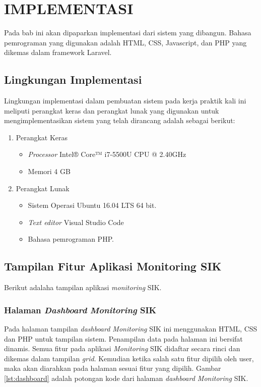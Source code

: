 \chapter{IMPLEMENTASI}
Pada bab ini akan dipaparkan implementasi dari sistem yang dibangun. Bahasa pemrograman yang digunakan adalah HTML, CSS, Javascript, dan PHP yang dikemas dalam framework Laravel.

\section{Lingkungan Implementasi}
\tab Lingkungan implementasi dalam pembuatan sistem pada kerja praktik kali ini meliputi perangkat keras dan perangkat lunak yang digunakan untuk mengimplementasikan sistem yang telah dirancang adalah sebagai berikut:
\begin{enumerate}
	\item Perangkat Keras
	\begin{itemize}
	\item \textit{Processor} Intel® Core™ i7-5500U CPU @ 2.40GHz
	\item Memori 4 GB
	\end{itemize}
	\item Perangkat Lunak
	\begin{itemize}
	\item Sistem Operasi Ubuntu 16.04 LTS 64 bit.
	\item \textit{Text editor} Visual Studio Code
	\item Bahasa pemrograman PHP.
	\end{itemize}
\end{enumerate}

\section{Tampilan Fitur Aplikasi Monitoring SIK}
Berikut adalaha tampilan aplikasi \textit{monitoring} SIK.
\subsection{Halaman \textit{Dashboard} \textit{Monitoring} SIK}
Pada halaman tampilan \textit{dashboard Monitoring} SIK ini menggunakan HTML, CSS dan PHP untuk tampilan sistem. Penampilan data pada halaman ini bersifat dinamis. Semua fitur pada aplikasi \textit{Monitoring} SIK didaftar secara rinci dan dikemas dalam tampilan \textit{grid}. Kemudian ketika salah satu fitur dipilih oleh user, maka akan diarahkan pada halaman sesuai fitur yang dipilih. Gambar \ref{lst:dashboard} adalah potongan kode dari halaman \textit{dashboard Monitoring} SIK.

